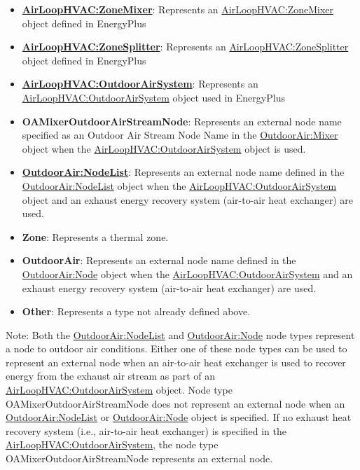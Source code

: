 \begin{itemize}
\item
  \textbf{\hyperref[airloophvaczonemixer]{AirLoopHVAC:ZoneMixer}}: Represents an \hyperref[airloophvaczonemixer]{AirLoopHVAC:ZoneMixer} object defined in EnergyPlus
\item
  \textbf{\hyperref[airloophvaczonesplitter]{AirLoopHVAC:ZoneSplitter}}: Represents an \hyperref[airloophvaczonesplitter]{AirLoopHVAC:ZoneSplitter} object defined in EnergyPlus
\item
  \textbf{\hyperref[airloophvacoutdoorairsystem]{AirLoopHVAC:OutdoorAirSystem}}: Represents an \hyperref[airloophvacoutdoorairsystem]{AirLoopHVAC:OutdoorAirSystem} object used in EnergyPlus
\item
  \textbf{OAMixerOutdoorAirStreamNode}: Represents an external node name specified as an Outdoor Air Stream Node Name in the \hyperref[outdoorairmixer]{OutdoorAir:Mixer} object when the \hyperref[airloophvacoutdoorairsystem]{AirLoopHVAC:OutdoorAirSystem} object is used.
\item
  \textbf{\hyperref[outdoorairnodelist]{OutdoorAir:NodeList}}: Represents an external node name defined in the \hyperref[outdoorairnodelist]{OutdoorAir:NodeList} object when the \hyperref[airloophvacoutdoorairsystem]{AirLoopHVAC:OutdoorAirSystem} object and an exhaust energy recovery system (air-to-air heat exchanger) are used.
\item
  \textbf{Zone}: Represents a thermal zone.
\item
  \textbf{OutdoorAir}: Represents an external node name defined in the \hyperref[outdoorairnode]{OutdoorAir:Node} object when the \hyperref[airloophvacoutdoorairsystem]{AirLoopHVAC:OutdoorAirSystem} and an exhaust energy recovery system (air-to-air heat exchanger) are used.
\item
  \textbf{Other}: Represents a type not already defined above.
\end{itemize}

Note: Both the \hyperref[outdoorairnodelist]{OutdoorAir:NodeList} and \hyperref[outdoorairnode]{OutdoorAir:Node} node types represent a node to outdoor air conditions. Either one of these node types can be used to represent an external node when an air-to-air heat exchanger is used to recover energy from the exhaust air stream as part of an \hyperref[airloophvacoutdoorairsystem]{AirLoopHVAC:OutdoorAirSystem} object. Node type OAMixerOutdoorAirStreamNode does not represent an external node when an \hyperref[outdoorairnodelist]{OutdoorAir:NodeList} or \hyperref[outdoorairnode]{OutdoorAir:Node} object is specified. If no exhaust heat recovery system (i.e., air-to-air heat exchanger) is specified in the \hyperref[airloophvacoutdoorairsystem]{AirLoopHVAC:OutdoorAirSystem}, the node type OAMixerOutdoorAirStreamNode represents an external node.

